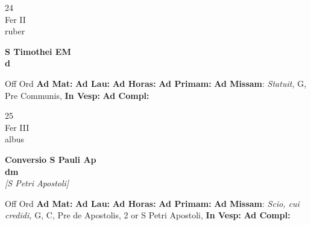 \documentclass[10pt, openany]{book}
\begin{document}
    \begin{center}
        \begin{minipage}{3.5in}
            \vspace{2em}
            \begin{minipage}{0.5in}
                {\Huge 24} \\
                {\normalsize Fer II} \\
                {\normalsize ruber}
            \end{minipage}
            \begin{minipage}{3.0in}
                \textbf{ \large S Timothei EM \\
                \textnormal{\normalsize d}} \\ 
            \end{minipage}
            \begin{justify}Off Ord
                \textbf{Ad Mat: }
                \textbf{Ad Lau: }
                \textbf{Ad Horas: }
                \textbf{Ad Primam: }\textbf{Ad Missam}: \textit{Statuit,} G, Pre Communis,  
                \textbf{In Vesp: }
                \textbf{Ad Compl: }
            \end{justify}
        \end{minipage}
    \end{center}

    \begin{center}
        \begin{minipage}{3.5in}
            \vspace{2em}
            \begin{minipage}{0.5in}
                {\Huge 25} \\
                {\normalsize Fer III} \\
                {\normalsize albus}
            \end{minipage}
            \begin{minipage}{3.0in}
                \textbf{ \large Conversio S Pauli Ap \\
                \textnormal{\normalsize dm}} \\ \textit{[S Petri Apostoli]} \\ 
            \end{minipage}
            \begin{justify}Off Ord
                \textbf{Ad Mat: }
                \textbf{Ad Lau: }
                \textbf{Ad Horas: }
                \textbf{Ad Primam: }\textbf{Ad Missam}: \textit{Scio, cui credidi,} G, C, Pre de Apostolis, 2 or S Petri Apostoli,  
                \textbf{In Vesp: }
                \textbf{Ad Compl: }
            \end{justify}
        \end{minipage}
    \end{center}
\end{document}
